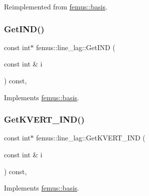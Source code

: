 Reimplemented from \mbox{\hyperlink{classfemus_1_1basis_a2ba867dcfa634c47f1c52caddd9bfdba}{femus\+::basis}}.

\mbox{\label{classfemus_1_1line__lag_ae8291eceb0b48fd46da4112a75832ad2}} 
\subsubsection{\texorpdfstring{Get\+I\+N\+D()}{GetIND()}}
{\footnotesize\ttfamily const int$\ast$ femus\+::line\+\_\+lag\+::\+Get\+I\+ND (\begin{DoxyParamCaption}\item[{const int \&}]{i }\end{DoxyParamCaption}) const\hspace{0.3cm}{\ttfamily [inline]}, {\ttfamily [virtual]}}



Implements \mbox{\hyperlink{classfemus_1_1basis_a3f63ad97ce70cd4a1196ede69f1f144b}{femus\+::basis}}.

\mbox{\label{classfemus_1_1line__lag_af8c8c5450968f7e99f0229743c3098c8}} 
\subsubsection{\texorpdfstring{Get\+K\+V\+E\+R\+T\+\_\+\+I\+N\+D()}{GetKVERT\_IND()}}
{\footnotesize\ttfamily const int$\ast$ femus\+::line\+\_\+lag\+::\+Get\+K\+V\+E\+R\+T\+\_\+\+I\+ND (\begin{DoxyParamCaption}\item[{const int \&}]{i }\end{DoxyParamCaption}) const\hspace{0.3cm}{\ttfamily [inline]}, {\ttfamily [virtual]}}



Implements \mbox{\hyperlink{classfemus_1_1basis_a95ceb3feae4c484b0baa6a4d35d38909}{femus\+::basis}}.

\mbox{\label{classfemus_1_1line__lag_a7bb107fa83cf2cc51202f96f10167dc8}} 
